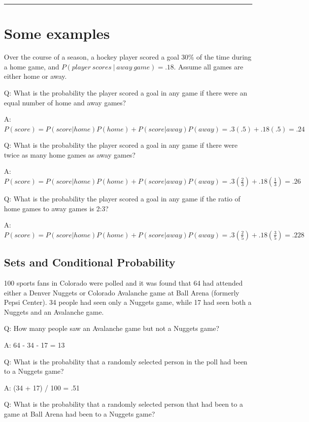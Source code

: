 \documentclass[
]{book}
\theoremstyle{definition}
\theoremstyle{definition}
\theoremstyle{definition}
\theoremstyle{definition}
\theoremstyle{remark}
\begin{document}
\begin{center}\rule{0.5\linewidth}{0.5pt}\end{center}

\hypertarget{some-examples}{%
\section{Some examples}\label{some-examples}}

Over the course of a season, a hockey player scored a goal 30\% of the time during a home game, and \(P(player\ scores\ |\ away\ game) = .18\). Assume all games are either home or away.

Q: What is the probability the player scored a goal in any game if there were an equal number of home and away games?

A: \(P(score) = P(score|home)P(home) + P(score|away)P(away) = .3(.5) + .18(.5) = .24\)

Q: What is the probability the player scored a goal in any game if there were twice as many home games as away games?

A: \(P(score) = P(score|home)P(home) + P(score|away)P(away) = .3(\frac{2}{3}) + .18(\frac{1}{3}) = .26\)

Q: What is the probability the player scored a goal in any game if the ratio of home games to away games is 2:3?

A: \(P(score) = P(score|home)P(home) + P(score|away)P(away) = .3(\frac{2}{5}) + .18(\frac{3}{5}) = .228\)

\hypertarget{sets-and-conditional-probability}{%
\subsection{Sets and Conditional Probability}\label{sets-and-conditional-probability}}

100 sports fans in Colorado were polled and it was found that 64 had attended either a Denver Nuggets or Colorado Avalanche game at Ball Arena (formerly Pepsi Center). 34 people had seen only a Nuggets game, while 17 had seen both a Nuggets and an Avalanche game.

Q: How many people saw an Avalanche game but not a Nuggets game?

A: 64 - 34 - 17 = 13

Q: What is the probability that a randomly selected person in the poll had been to a Nuggets game?

A: (34 + 17) / 100 = .51

Q: What is the probability that a randomly selected person that had been to a game at Ball Arena had been to a Nuggets game?
\end{document}
